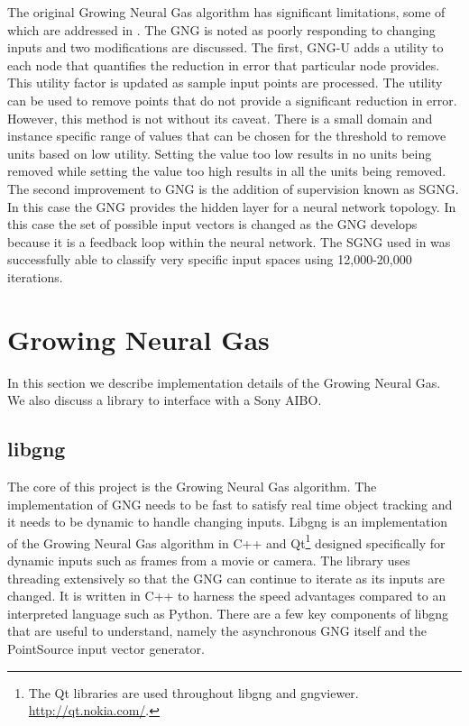\documentclass{article}
\renewcommand{\|}{\origbar} %
\begin{document}
The original Growing Neural Gas algorithm has significant limitations, some of which are addressed in . The GNG is noted as poorly responding to changing inputs and two modifications are discussed. The first, GNG-U adds a utility to each node that quantifies the reduction in error that particular node provides. This utility factor is updated as sample input points are processed. The utility can be used to remove points that do not provide a significant reduction in error. However, this method is not without its caveat. There is a small domain and instance specific range of values that can be chosen for the threshold to remove units based on low utility. Setting the value too low results in no units being removed while setting the value too high results in all the units being removed. The second improvement to GNG is the addition of supervision known as SGNG. In this case the GNG provides the hidden layer for a neural network topology. In this case the set of possible input vectors is changed as the GNG develops because it is a feedback loop within the neural network. The SGNG used in  was successfully able to classify very specific input spaces using 12,000-20,000 iterations.

\section{Growing Neural Gas}
\label{sec:GNG}

In this section we describe implementation details of the Growing Neural Gas. We also discuss a library to interface with a Sony AIBO.

\subsection{libgng}

The core of this project is the Growing Neural Gas algorithm. The implementation of GNG needs to be fast to satisfy real time object tracking and it needs to be dynamic to handle changing inputs. Libgng is an implementation of the Growing Neural Gas algorithm in C++ and Qt\footnote{The Qt libraries are used throughout libgng and gngviewer. \url{http://qt.nokia.com/}.} designed specifically for dynamic inputs such as frames from a movie or camera. The library uses threading extensively so that the GNG can continue to iterate as its inputs are changed. It is written in C++ to harness the speed advantages compared to an interpreted language such as Python. There are a few key components of libgng that are useful to understand, namely the asynchronous GNG itself and the PointSource input vector generator.
\end{document}

